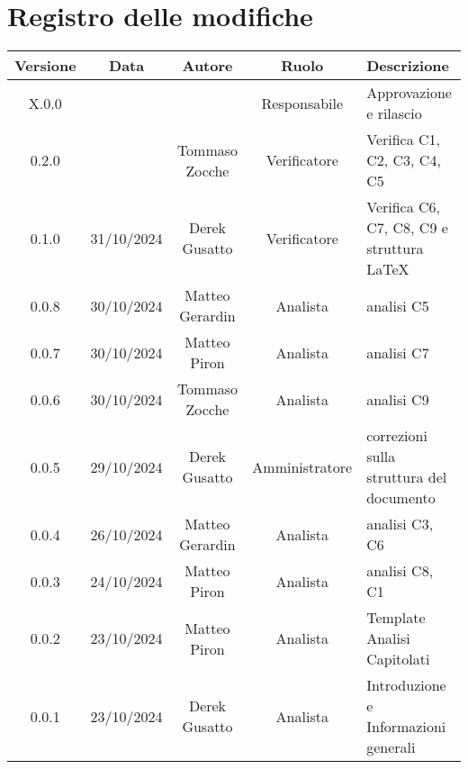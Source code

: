 
\section*{Registro delle modifiche}
\begin{table}[H]
    \begin{tabular}{|c|c|c|c|p{3cm}|}
        \hline
        \textbf{Versione} &  \textbf{Data} &  \textbf{Autore} &  \textbf{Ruolo} & \textbf{Descrizione} \\
        \hline
        X.0.0 &  &  & Responsabile & Approvazione e rilascio\\
        \hline
        0.2.0 &  & Tommaso Zocche & Verificatore & Verifica C1, C2, C3, C4, C5\\
        \hline
        0.1.0 & 31/10/2024 & Derek Gusatto & Verificatore & Verifica C6, C7, C8, C9 e struttura LaTeX \\
        \hline
        0.0.8 & 30/10/2024 & Matteo Gerardin & Analista & analisi C5 \\
        \hline
        0.0.7 & 30/10/2024 & Matteo Piron & Analista & analisi C7 \\
        \hline
        0.0.6 & 30/10/2024 & Tommaso Zocche & Analista & analisi C9 \\
        \hline
        0.0.5 & 29/10/2024 & Derek Gusatto & Amministratore &  correzioni sulla struttura del documento\\
        \hline
        0.0.4 & 26/10/2024 & Matteo Gerardin & Analista & analisi C3, C6 \\
        \hline
        0.0.3 & 24/10/2024 & Matteo Piron & Analista & analisi C8, C1 \\
        \hline
        0.0.2 & 23/10/2024 & Matteo Piron & Analista & Template Analisi Capitolati \\
        \hline
        0.0.1 & 23/10/2024 & Derek Gusatto & Analista & Introduzione e Informazioni generali \\
        \hline
    \end{tabular}
\end{table}